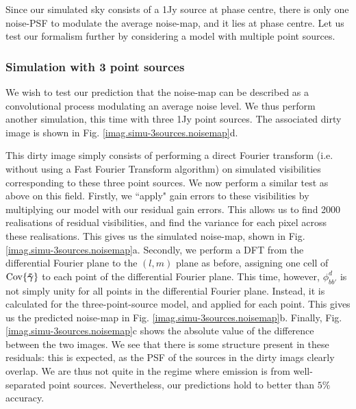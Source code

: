 \pg
{Since our simulated sky consists of a 1Jy source at phase centre, there is only one noise-PSF to modulate the average noise-map, and it lies at phase centre. Let us test our formalism further by considering a model with multiple point sources.}

\subsubsection{Simulation with 3 point sources}

\pg
{We wish to test our prediction that the noise-map can be described as a convolutional process modulating an average noise level. We thus perform another simulation, this time with three 1Jy point sources. The associated dirty image is shown in Fig. \ref{imag.simu-3sources.noisemap}d. }



\pg
{This dirty image simply consists of performing a direct Fourier transform (i.e. without using a Fast Fourier Transform algorithm) on simulated visibilities corresponding to these three point sources. We now perform a similar test as above on this field. Firstly, we ``apply" gain errors to these visibilities by multiplying our model with our residual gain errors. This allows us to find 2000 realisations of residual visibilities, and find the variance for each pixel across these realisations. This gives us the simulated noise-map, shown in Fig. \ref{imag.simu-3sources.noisemap}a. Secondly, we perform a DFT from the differential Fourier plane to the $(l,m)$ plane as before, assigning one cell of $\textrm{Cov}\{\bm{\tilde{\gamma}}\}$ to each point of the differential Fourier plane. This time, however, $\phi_{bb'}^d$ is not simply unity for all points in the differential Fourier plane. Instead, it is calculated for the three-point-source model, and applied for each point. This gives us the predicted noise-map in Fig. \ref{imag.simu-3sources.noisemap}b. Finally, Fig. \ref{imag.simu-3sources.noisemap}c shows the absolute value of the difference between the two images. We see that there is some structure present in these residuals: this is expected, as the PSF of the sources in the dirty imags clearly overlap. We are thus not quite in the regime where emission is from well-separated point sources. Nevertheless, our predictions hold to better than $5\%$ accuracy. }

